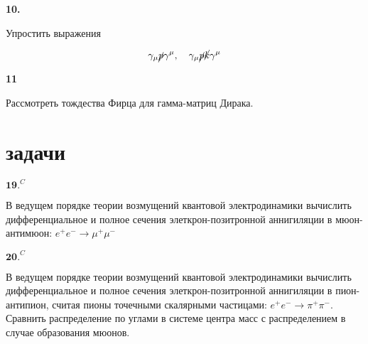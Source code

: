 \documentclass[a4paper,12pt]{article} %
\begin{document}
\begin{task} \textbf{10.} 

Упростить выражения

$$
\gamma_{\mu} \cancel{p} \gamma^{\mu}, \quad \gamma_{\mu} \cancel{p} \cancel{k} \gamma^{\mu}
$$























\end{task}



\begin{task}\textbf{11}

Рассмотреть тождества Фирца для гамма-матриц Дирака.









\end{task}


\section{задачи}


\begin{ttask} $\mathbf{1 9 .}^{C}$ 

В ведущем порядке теории возмущений квантовой электродинамики вычислить 
дифференциальное и полное сечения элеткрон-позитронной аннигиляции в мюон-антимюон: 
$e^{+} e^{-} \rightarrow \mu^{+} \mu^{-}$









\end{ttask}



\begin{ttask} $\mathbf{2 0 .}^{C}$ 
	
В ведущем порядке теории возмущений квантовой электродинамики вычислить дифференциальное и полное сечения элеткрон-позитронной аннигиляции в пион-антипион, 
считая пионы точечными скалярными частицами: $e^{+} e^{-} \rightarrow \pi^{+} \pi^{-} .$ 
Сравнить распределение по углами в системе центра масс с распределением в случае образования мюонов.














\end{ttask}
\end{document}
